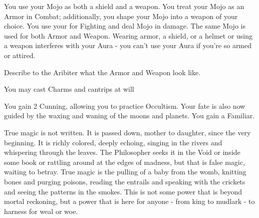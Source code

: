 {    



    You use your Mojo as both a shield and a weapon.  You treat your Mojo as an Armor \UD in Combat; additionally, you shape your Mojo into a weapon of your choice.  You use your \FOC for Fighting and deal Mojo \UD in damage. The same Mojo \UD is used for both Armor and Weapon.  Wearing armor, a shield, or a helmet or using a weapon interferes with your Aura - you can't use your Aura if you're so armed or attired.

    Describe to the Aribiter what the Armor and Weapon look like.


    You may cast Charms and cantrips at will\footnotemark


    You gain 2 Cunning, allowing you to practice Occultism.  Your fate is also now guided by the waxing and waning of the moons and planets.  You gain a Familiar.\footnotemark[\value{footnote}]


    True magic is not written. It is passed down, mother to daughter, since the very beginning.  It is richly colored, deeply echoing, singing in the rivers and whispering through the leaves.  The Philosopher seeks it in the Void or inside some book or rattling around at the edges of madness, but that is false magic, waiting to betray.  True magic is the pulling of a baby from the womb, knitting bones and purging poisons, reading the entrails and speaking with the crickets and seeing the patterns in the smokes. This is not some power that is beyond mortal reckoning, but a power that is here for anyone - from king to mudlark - to harness for weal or woe.

}
